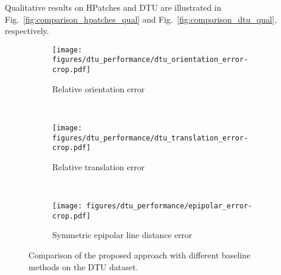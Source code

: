 \documentclass[10pt,twocolumn,letterpaper]{article}
\begin{document}
\begin{table}[t!]
\begin{center}
\end{center}
\vspace{-2mm}
\caption{Normalized Jaccard index (higher is better) produced by the~\texttt{DGC+M-Net} model on HPatches evaluation dataset with different types of synthetic transformations of ($T$) training dataset.}\label{tbl:jaccard_hpatches}
\end{table}

Qualitative results on HPatches and DTU are illustrated in Fig.~\ref{fig:comparison_hpatches_qual} and Fig.~\ref{fig:comparison_dtu_qual}, respectively.

\begin{figure*}[t!]
 	\centering
 	\begin{subfigure}[t]{.3\textwidth}
 		\centering
 		\texttt{[image: figures/dtu\_performance/dtu\_orientation\_error-crop.pdf]}
 		\caption{Relative orientation error}\label{fig:relative_pose_dtu_orient}
 	\end{subfigure}~
 	\begin{subfigure}[t]{.3\textwidth}
 		\centering
 		\texttt{[image: figures/dtu\_performance/dtu\_translation\_error-crop.pdf]}
 		\caption{Relative translation error}\label{fig:relative_pose_dtu_transl}
 	\end{subfigure}~
 	\begin{subfigure}[t]{.3\textwidth}
 		\centering
 		\texttt{[image: figures/dtu\_performance/epipolar\_error-crop.pdf]}
 		\caption{Symmetric epipolar line distance error}\label{fig:f_epipolar_error}
 	\end{subfigure}
\caption{Comparison of the proposed approach with different baseline methods on the DTU dataset.}\label{fig:relative_pose_dtu}
\end{figure*}
\end{document}

